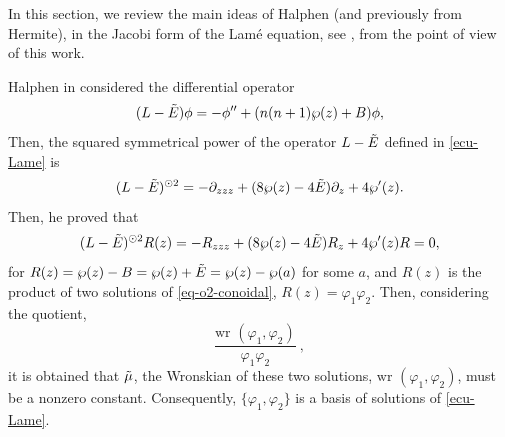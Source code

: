 \documentclass[a4paper,12pt]{article}
\newcommand{\tw}{\textrm{wr }}
\begin{document}
In this section, we review  the main ideas of  Halphen (and previously from  Hermite), in the Jacobi form of the Lam\'e equation, see \cite{HALP, WW}, from the point of view of this work. 

Halphen   in \cite{HALP} considered the differential operator
\begin{equation*} %
(L-\Tilde{E} ) \phi = -\phi''+(n(n+1)\wp(z)+B)\phi,
\end{equation*}
Then, the  squared symmetrical power of the operator $L-\Tilde{E}$ defined in  \eqref{ecu-Lame} is \cite{BRONSTEIN1996}
\begin{equation}\label{eq-o2-conoidal}
(L-\Tilde{E} )^{\odot 2}     =  -\partial_{zzz} + (8\wp (z)-4 \Tilde{E} )\partial_z +4\wp'(z) . 
\end{equation}
Then, he proved that 
\begin{equation}\label{ec-aux-Lame}
 (L-\Tilde{E} )^{\odot 2} R(z)=  -R_{zzz} + (8\wp (z)-4 \Tilde{E} )R_z +4\wp'(z)  R=0 ,
\end{equation}
for $R(z)=\wp(z)-B=\wp(z)+\Tilde{E}=\wp(z)-\wp(a) $ for some  $a$, and $R(z)$ is the product of two solutions of \eqref{eq-o2-conoidal}, 
 $R(z)=\varphi_1\varphi_2$. Then, considering the quotient,
\begin{equation}\label{formula-wronskian}
   \frac{\tw(\varphi_1 ,\varphi_2 )}{\varphi_1 \varphi_2 } \ ,
\end{equation}
it is obtained that  $\Tilde{\mu}$, the Wronskian of these two solutions, $\tw (\varphi_1 ,\varphi_2 )$, must be a nonzero constant. Consequently, $\{ \varphi_1 ,\varphi_2 \}$ is a basis of solutions of \eqref{ecu-Lame}.
\end{document}
